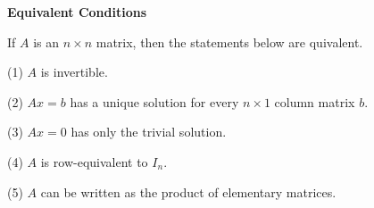 \nopagenumbers
{\bf Equivalent Conditions}
\vskip 1mm

\vskip 6pt
If $A$ is an $n\times n$ matrix, then the statements below are quivalent.

\vskip 6pt
(1) $A$ is invertible.

\vskip 6pt
(2) $Ax=b$ has a unique solution for every $n\times 1$ column matrix $b$.

\vskip 6pt
(3) $Ax=0$ has only the trivial solution.

\vskip 6pt
(4) $A$ is row-equivalent to $I_n$.

\vskip 6pt
(5) $A$ can be written as the product of elementary matrices.

\vfill\eject
\bye
